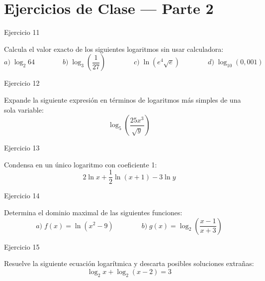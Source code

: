 \documentclass[aspectratio=169]{beamer}
\begin{document}
\section{Ejercicios de Clase — Parte 2}

\begin{frame}{Ejercicio 11}
  \begin{mwejercicio}
    Calcula el valor exacto de los siguientes logaritmos sin usar calculadora:
    $$a)\; \log_2 64 \qquad\qquad b)\; \log_3\left(\frac{1}{27}\right) \qquad\qquad c)\; \ln(e^4 \sqrt{e}) \qquad\qquad d)\; \log_{10}(0{,}001)$$
  \end{mwejercicio}
  \vspace{3.5cm}
\end{frame}
\begin{frame}{Ejercicio 12}
  \begin{mwejercicio}
    Expande la siguiente expresión en términos de logaritmos más simples de una sola variable:
    $$\log_5\left(\frac{25 x^3}{\sqrt{y}}\right)$$
  \end{mwejercicio}
  \vspace{3.5cm}
\end{frame}
\begin{frame}{Ejercicio 13}
  \begin{mwejercicio}
    Condensa en un único logaritmo con coeficiente 1:
    $$2 \ln x + \frac{1}{2} \ln(x + 1) - 3 \ln y$$
  \end{mwejercicio}
  \vspace{3.5cm}
\end{frame}
\begin{frame}{Ejercicio 14}
  \begin{mwejercicio}
    Determina el dominio maximal de las siguientes funciones:
    $$a)\; f(x) = \ln(x^2 - 9) \qquad\qquad b)\; g(x) = \log_2\left(\frac{x - 1}{x + 3}\right)$$
  \end{mwejercicio}
  \vspace{3.5cm}
\end{frame}
\begin{frame}{Ejercicio 15}
  \begin{mwejercicio}
    Resuelve la siguiente ecuación logarítmica y descarta posibles soluciones extrañas:
    $$\log_2 x + \log_2(x - 2) = 3$$
  \end{mwejercicio}
  \vspace{3.5cm}
\end{frame}
\end{document}
